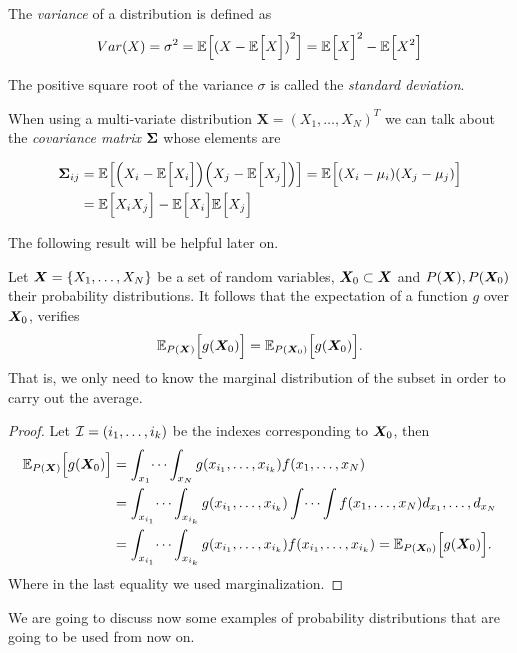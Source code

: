 \begin{definition}
  The \emph{variance} of a distribution is defined as
  \[
    Var(X) = \sigma^2 = \mathbb{E}_{}\Big[{(X - \mathbb{E}_{}\Big[X\Big])}^2\Big] = \mathbb{E}_{}\Big[X\Big]^2 - \mathbb{E}_{}\Big[X^2\Big]
  \]

  The positive square root of the variance \(\sigma\) is called the \emph{standard deviation}.
\end{definition}

When using a multi-variate distribution \(\bm{X} = {(X_1,\dots,X_N)}^T\) we can talk about the \emph{covariance
  matrix} \(\bm{\Sigma} \) whose elements are

\[
\begin{aligned}
\bm{\Sigma}_{ij} &= \mathbb{E}_{}\Big[\Big(X_i - \mathbb{E}_{}\Big[X_i\Big]\Big)
  \Big(X_j - \mathbb{E}_{}\Big[X_j\Big]\Big)\Big] = \mathbb{E}_{}\Big[(X_i - \mu_i)(X_j - \mu_j)\Big]\\
&=\mathbb{E}_{}\Big[X_i X_j\Big]-\mathbb{E}_{}\Big[X_i\Big]\mathbb{E}_{}\Big[X_j\Big]
\end{aligned}
\]

The following result will be helpful later on.

\begin{proposition}\label{prop:expectation_over_marginal}
  Let \(\bm{X} = \{X_1,\dots,X_N\}\) be a set of random variables,
  \(\bm{X}_{0} \subset \bm{X}\) and \(P(\bm{X}), P(\bm{X}_{0})\)
  their probability distributions.
  It follows that the expectation of a function \(g\) over \(\bm{X}_0\), verifies
    \[
      \mathbb{E}_{P(\bm{X})}\Big[g(\bm{X}_0)\Big] = \mathbb{E}_{P(\bm{X}_0)}\Big[g(\bm{X}_0)\Big].
    \]
    That is, we only need to know the marginal distribution of the subset in
    order to carry out the average.
\end{proposition}

\begin{proof}
  Let \(\mathcal{I} = (i_{1}, \dots, i_{k})\) be the indexes corresponding to \(\bm{X}_{0}\), then
  \[
    \begin{aligned}
      \mathbb{E}_{P(\bm{X})}\Big[g(\bm{X}_{0})\Big]&= \int_{x_{1}}\dots\int_{x_{N}}g(x_{i_{1}},\dots,x_{i_{k}})f(x_{1},\dots,x_{N}) \\
      &= \int_{x_{i_{1}}}\dots\int_{x_{i_{k}}} g(x_{i_{1}},\dots,x_{i_{k}}) \int \dots \int f(x_{1},\dots,x_{N}) d_{x_{1}},\dots,d_{x_{N}}\\
      &= \int_{x_{i_{1}}}\dots\int_{x_{i_{k}}} g(x_{i_{1}},\dots,x_{i_{k}}) f(x_{i_{1}},\dots,x_{i_{k}}) =  \mathbb{E}_{P(\bm{X}_{0})}\Big[g(\bm{X}_{0})\Big].\\
      \end{aligned}
  \]
Where in the last equality we used marginalization.
\end{proof}

We are going to discuss now some examples of probability distributions that are
going to be used from now on.

